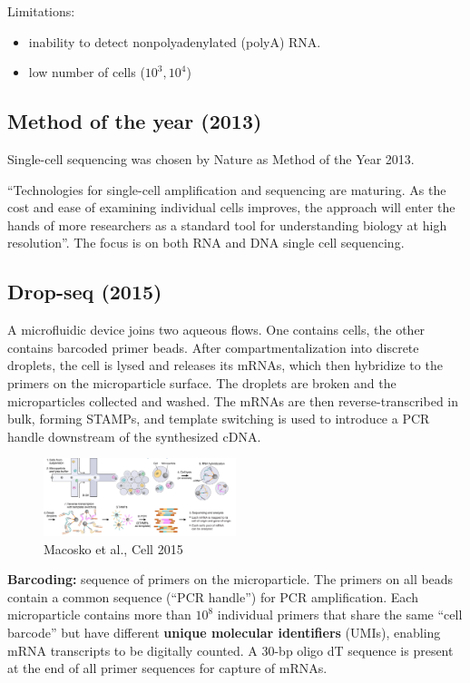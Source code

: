 Limitations:

\begin{itemize}
\tightlist
\item
  inability to detect nonpolyadenylated (polyA) RNA.
\item
  low number of cells ($10^3,10^4$)
\end{itemize}

\hypertarget{method-of-the-year-2013}{%
\subsection{Method of the year (2013)}\label{method-of-the-year-2013}}

Single-cell sequencing was chosen by Nature as Method of the Year 2013.

``Technologies for single-cell amplification and sequencing are
maturing. As the cost and ease of examining individual cells improves,
the approach will enter the hands of more researchers as a standard tool
for understanding biology at high resolution''. The focus is on both RNA
and DNA single cell sequencing.

\hypertarget{drop-seq-2015}{%
\subsection{Drop-seq (2015)}\label{drop-seq-2015}}

A microfluidic device joins two aqueous flows. One contains cells, the
other contains barcoded primer beads. After compartmentalization into
discrete droplets, the cell is lysed and releases its mRNAs, which then
hybridize to the primers on the microparticle surface. The droplets are
broken and the microparticles collected and washed. The mRNAs are then
reverse-transcribed in bulk, forming STAMPs, and template switching is
used to introduce a PCR handle downstream of the synthesized cDNA.

\begin{figure}
\centering
\includegraphics[width=0.5\textwidth]{images/Screen_Shot_2023-02-21_at_19-51-12.png}
\caption{Macosko et al., Cell 2015}
\end{figure}

\textbf{Barcoding:} sequence of primers on the microparticle. The
primers on all beads contain a common sequence (``PCR handle'') for PCR
amplification. Each microparticle contains more than $10^8$ individual
primers that share the same ``cell barcode'' but have different
\textbf{unique molecular identifiers} (UMIs), enabling mRNA transcripts
to be digitally counted. A 30-bp oligo dT sequence is present at the end
of all primer sequences for capture of mRNAs.

